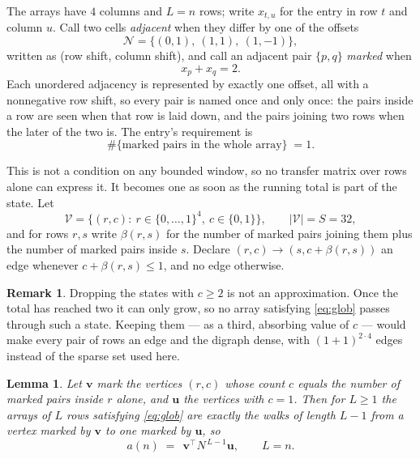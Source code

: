\documentclass[11pt,a4paper]{article}
\theoremstyle{plain}
\newtheorem{lemma}[theorem]{Lemma}
\theoremstyle{definition}
\newtheorem{remark}[theorem]{Remark}
\begin{document}
The arrays have $4$ columns and $L=n$ rows; write $x_{t,u}$ for the entry in
row $t$ and column $u$. Call two cells \emph{adjacent} when they differ by one of the
offsets
\[
\mathcal N=\{(0,1),\ (1,1),\ (1,-1)\},
\]
written as (row shift, column shift), and call an adjacent pair $\{p,q\}$
\emph{marked} when
\[
x_{p}+x_{q}=2 .
\]
Each unordered adjacency is represented by exactly one offset, all with a nonnegative row
shift, so every pair is named once and only once: the pairs inside a row are seen when
that row is laid down, and the pairs joining two rows when the later of the two is. The
entry's requirement is
\begin{equation}\label{eq:glob}
\#\{\text{marked pairs in the whole array}\}\;=1.
\end{equation}

This is not a condition on any bounded window, so no transfer matrix over rows alone can
express it. It becomes one as soon as the running total is part of the state. Let
\[
\mathcal V=\bigl\{(r,c):\ r\in\{0,\dots,1\}^{4},\ c\in\{0,1\}\bigr\},
\qquad |\mathcal V|=S=32,
\]
and for rows $r,s$ write $\beta(r,s)$ for the number of marked pairs joining them plus the
number of marked pairs inside $s$. Declare $(r,c)\to(s,c+\beta(r,s))$ an edge whenever
$c+\beta(r,s)\le1$, and no edge otherwise.

\begin{remark}
Dropping the states with $c\ge2$ is not an approximation. Once the total has reached two it
can only grow, so no array satisfying \eqref{eq:glob} passes through such a state. Keeping
them --- as a third, absorbing value of $c$ --- would make every pair of rows an edge and
the digraph dense, with $(1+1)^{2\cdot4}$ edges instead of the sparse set used here.
\end{remark}

\begin{lemma}\label{lem:walk}
Let $\mathbf{v}$ mark the vertices $(r,c)$ whose count $c$ equals the number of marked pairs
inside $r$ alone, and $\mathbf{u}$ the vertices with $c=1$. Then for $L\ge1$ the arrays
of $L$ rows satisfying \eqref{eq:glob} are exactly the walks of length $L-1$ from a
vertex marked by $\mathbf{v}$ to one marked by $\mathbf{u}$, so
\[
a(n)\;=\;\,\mathbf{v}^{\!\top}N^{\,L-1}\mathbf{u},\qquad L=n .
\]
\end{lemma}
\end{document}
